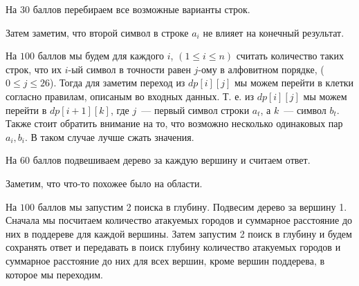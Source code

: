 \documentclass[12pt]{article}
\begin{document}
\EndEditorial


На $30$ баллов перебираем все возможные варианты строк.

Затем заметим, что второй символ в строке $a_i$ не влияет на конечный результат.

На $100$ баллов мы будем для каждого $i$, $(1 \le i \le n)$ считать количество таких строк, что их $i$-ый символ в точности равен $j$-ому в алфовитном порядке, ($0 \le j \le 26$).
Тогда для заметим переход из $dp[i][j]$ мы можем перейти в клетки согласно правилам, описаным во входных данных. Т. е. из $dp[i][j]$ мы можем перейти в $dp[i + 1][k]$,
где $j$~--- первый символ строки $a_t$, а $k$~--- символ $b_t$.
Также стоит обратить внимание на то, что возможно несколько одинаковых пар $a_i, b_i$. В таком случае лучше сжать значения.

\EndEditorial


На $60$ баллов подвешиваем дерево за каждую вершину и считаем ответ.

Заметим, что что-то похожее было на области.

На $100$ баллов мы запустим 2 поиска в глубину. Подвесим дерево за вершину 1.
Сначала мы посчитаем количество атакуемых городов и суммарное расстояние до них в поддереве для каждой вершины.
Затем запустим 2 поиск в глубину и будем сохранять ответ и передавать в поиск глубину количество атакуемых городов и суммарное расстояние до них для всех вершин, кроме вершин поддерева, в которое мы переходим.

\EndEditorial
\end{document}
